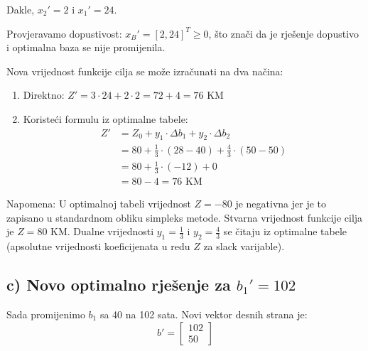 \documentclass[12pt,a4paper]{article}
\begin{document}
Dakle, $x_2' = 2$ i $x_1' = 24$.

Provjeravamo dopustivost: $x_B' = [2, 24]^T \geq 0$, što znači da je rješenje dopustivo i optimalna baza se nije promijenila.

Nova vrijednost funkcije cilja se može izračunati na dva načina:
\begin{enumerate}
\item Direktno: $Z' = 3 \cdot 24 + 2 \cdot 2 = 72 + 4 = 76$ KM
\item Koristeći formulu iz optimalne tabele:
\begin{align}
Z' &= Z_0 + y_1 \cdot \Delta b_1 + y_2 \cdot \Delta b_2 \\
&= 80 + \frac{1}{3} \cdot (28 - 40) + \frac{4}{3} \cdot (50 - 50) \\
&= 80 + \frac{1}{3} \cdot (-12) + 0 \\
&= 80 - 4 = 76 \text{ KM}
\end{align}
\end{enumerate}

Napomena: U optimalnoj tabeli vrijednost $Z = -80$ je negativna jer je to zapisano u standardnom obliku simpleks metode. Stvarna vrijednost funkcije cilja je $Z = 80$ KM. Dualne vrijednosti $y_1 = \frac{1}{3}$ i $y_2 = \frac{4}{3}$ se čitaju iz optimalne tabele (apsolutne vrijednosti koeficijenata u redu $Z$ za slack varijable).

\subsection{c) Novo optimalno rješenje za $b_1' = 102$}

Sada promijenimo $b_1$ sa 40 na 102 sata. Novi vektor desnih strana je:
\begin{equation}
b' = \begin{bmatrix} 102 \\ 50 \end{bmatrix}
\end{equation}
\end{document}
